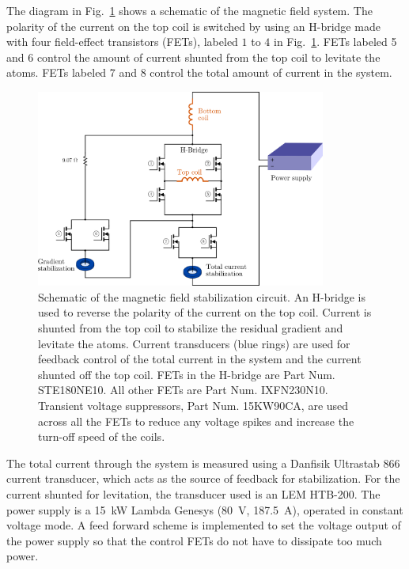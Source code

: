 The diagram in Fig.~\ref{fig:fieldcircuit} shows a schematic of the magnetic
field system.  The polarity of the current on the top coil is switched by using
an H-bridge made with four field-effect transistors (FETs), labeled $1$ to $4$ in
Fig.~\ref{fig:fieldcircuit}.   FETs labeled 5 and 6 control the amount of
current shunted from the top coil to levitate the atoms.  FETs labeled 7 and 8
control the total amount of current in the system.  
\begin{figure} 
\centering
\includegraphics[width=0.85\textwidth]{../masters-figures/coils/fieldcontrol.png}
\caption[Magnetic field control circuit]{\small Schematic of the magnetic field
stabilization circuit.  An H-bridge is used to reverse the polarity of the
current on the top coil.  Current is shunted from the top coil to stabilize the
residual gradient and levitate the atoms.  Current transducers (blue rings) are used
for feedback control of the total current in the system and the current shunted
off the top coil. 
FETs in the H-bridge are Part Num.
STE180NE10.  All other FETs are Part Num. IXFN230N10.  Transient voltage
suppressors, Part Num. 15KW90CA, are used across all the FETs to reduce any
voltage spikes and increase the turn-off speed of the coils.}
\label{fig:fieldcircuit} 
\end{figure} 
The total current through the system is measured  using a Danfisik Ultrastab
866 current transducer, which acts as the source of feedback for stabilization.
For the current shunted for levitation, the transducer used is an LEM HTB-200.
The power supply is a  15~kW Lambda Genesys (80~V, 187.5~A),  operated in
constant voltage mode. A feed forward scheme is implemented to set the voltage
output of the power supply so that the control FETs  do not have to dissipate
too much power.  

